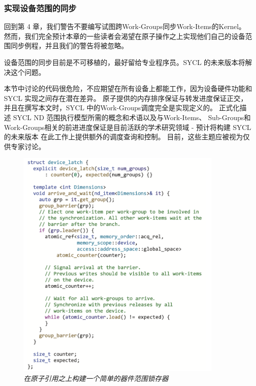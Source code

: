 \subsubsection{实现设备范围的同步}
回到第 4 章，我们警告不要编写试图跨Work-Groups同步Work-Items的Kernel。 
然而，我们完全预计本章的一些读者会渴望在原子操作之上实现他们自己的设备范围同步例程，并且我们的警告将被忽略。

\begin{remark}
	设备范围的同步目前是不可移植的，最好留给专业程序员。SYCL 的未来版本将解决这个问题。
\end{remark}

本节中讨论的代码很危险，不应期望在所有设备上都能工作，因为设备硬件功能和 SYCL 实现之间存在潜在差异。 
原子提供的内存排序保证与转发进度保证正交，并且在撰写本文时，SYCL 中的Work-Groups调度完全是实现定义的。 
正式化描述 SYCL ND 范围执行模型所需的概念和术语以及与Work-Items、
Sub-Groups和Work-Groups相关的前进进度保证是目前活跃的学术研究领域 - 
预计将构建 SYCL 的未来版本 在此工作上提供额外的调度查询和控制。 目前，这些主题应被视为仅供专家讨论。

\begin{figure}[H]
	\centering
	\includegraphics[width=0.9\textwidth]{figs/F19.18.png}
	\caption{\textit{在原子引用之上构建一个简单的器件范围锁存器 }}
\end{figure}

